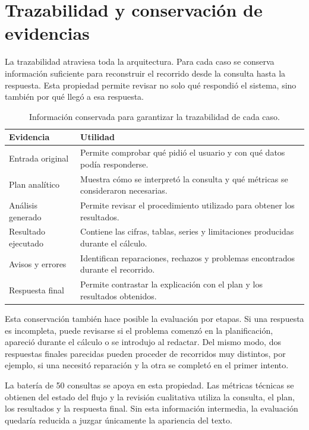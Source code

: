 \section{Trazabilidad y conservación de evidencias}

La trazabilidad atraviesa toda la arquitectura. Para cada caso se conserva información suficiente para reconstruir el recorrido desde la consulta hasta la respuesta. Esta propiedad permite revisar no solo qué respondió el sistema, sino también por qué llegó a esa respuesta.

\begin{table}[H]
\centering
\small
\begin{tabularx}{\textwidth}{L{0.24\textwidth}Y}
\toprule
\textbf{Evidencia} & \textbf{Utilidad} \\
\midrule
Entrada original & Permite comprobar qué pidió el usuario y con qué datos podía responderse. \\
Plan analítico & Muestra cómo se interpretó la consulta y qué métricas se consideraron necesarias. \\
Análisis generado & Permite revisar el procedimiento utilizado para obtener los resultados. \\
Resultado ejecutado & Contiene las cifras, tablas, series y limitaciones producidas durante el cálculo. \\
Avisos y errores & Identifican reparaciones, rechazos y problemas encontrados durante el recorrido. \\
Respuesta final & Permite contrastar la explicación con el plan y los resultados obtenidos. \\
\bottomrule
\end{tabularx}
\caption{Información conservada para garantizar la trazabilidad de cada caso.}
\label{tab:trazabilidad_diseno}
\end{table}

Esta conservación también hace posible la evaluación por etapas. Si una respuesta es incompleta, puede revisarse si el problema comenzó en la planificación, apareció durante el cálculo o se introdujo al redactar. Del mismo modo, dos respuestas finales parecidas pueden proceder de recorridos muy distintos, por ejemplo, si una necesitó reparación y la otra se completó en el primer intento.

La batería de 50 consultas se apoya en esta propiedad. Las métricas técnicas se obtienen del estado del flujo y la revisión cualitativa utiliza la consulta, el plan, los resultados y la respuesta final. Sin esta información intermedia, la evaluación quedaría reducida a juzgar únicamente la apariencia del texto.

